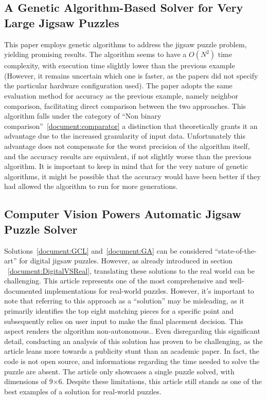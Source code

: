 \documentclass{article}
\begin{document}
\subsection{A Genetic Algorithm-Based Solver for Very Large Jigsaw Puzzles~\cite{GA}}
This paper employs genetic algorithms to address the
jigsaw puzzle problem, yielding promising results.\newline
The algorithm seems to have a \(O(N^2)\) time complexity,
with execution time slightly lower than the previous example
(However, it remains uncertain which one is faster, as the papers did not specify
the particular hardware configuration used).\newline
The paper adopts the same evaluation method for accuracy as the previous example,
namely neighbor comparison, facilitating direct comparison between the two approaches.
This algorithm falls under the category of “Non binary comparison”~\cref{document:comparator}
a distinction that theoretically grants it an advantage due to the increased granularity
of input data.
Unfortunately this advantage does not compensate for the worst precision
of the algorithm itself, and the accuracy results are equivalent,
if not slightly worse than the previous algorithm.\newline
It is important to keep in mind that for the very nature of genetic algorithms,
it might be possible that the accuracy would have been better if they had allowed
the algorithm to run for more generations.\label{document:GA}

\subsection{Computer Vision Powers Automatic Jigsaw Puzzle Solver~\cite{Abto}}
Solutions~\cref{document:GCL} and~\cref{document:GA} can be considered ``state-of-the-art''
for digital jigsaw puzzles.
However, as already introduced in section ~\cref{document:DigitalVSReal},
translating these solutions to the real world can be challenging.\newline
This article represents one of the most comprehensive and well-documented
implementations for real-world puzzles. However,
it's important to note that referring to this approach as a ``solution''
may be misleading, as it primarily identifies the top eight matching
pieces for a specific point and subsequently relies on user input to make
the final placement decision.
This aspect renders the algorithm non-autonomous..\newline
Even disregarding this significant detail,
conducting an analysis of this solution has proven to be challenging,
as the article leans more towards a publicity stunt than an academic paper.
In fact, the code is not open source, and informations regarding the time needed
to solve the puzzle are absent. The article only showcases a single puzzle solved,
with dimensions of 9\(\times\)6.\newline
Despite these limitations, this article still stands as one of the best examples of a solution
for real-world puzzles.
\end{document}
